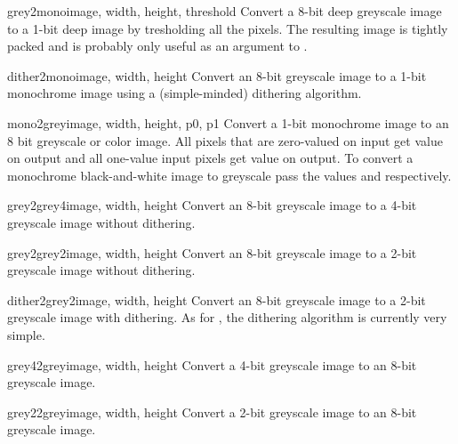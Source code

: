 \begin{funcdesc}{grey2mono}{image, width, height, threshold}
Convert a 8-bit deep greyscale image to a 1-bit deep image by
tresholding all the pixels.  The resulting image is tightly packed and
is probably only useful as an argument to .
\end{funcdesc}

\begin{funcdesc}{dither2mono}{image, width, height}
Convert an 8-bit greyscale image to a 1-bit monochrome image using a
(simple-minded) dithering algorithm.
\end{funcdesc}

\begin{funcdesc}{mono2grey}{image, width, height, p0, p1}
Convert a 1-bit monochrome image to an 8 bit greyscale or color image.
All pixels that are zero-valued on input get value  on output
and all one-value input pixels get value  on output.  To
convert a monochrome black-and-white image to greyscale pass the
values  and  respectively.
\end{funcdesc}

\begin{funcdesc}{grey2grey4}{image, width, height}
Convert an 8-bit greyscale image to a 4-bit greyscale image without
dithering.
\end{funcdesc}

\begin{funcdesc}{grey2grey2}{image, width, height}
Convert an 8-bit greyscale image to a 2-bit greyscale image without
dithering.
\end{funcdesc}

\begin{funcdesc}{dither2grey2}{image, width, height}
Convert an 8-bit greyscale image to a 2-bit greyscale image with
dithering.  As for , the dithering algorithm
is currently very simple.
\end{funcdesc}

\begin{funcdesc}{grey42grey}{image, width, height}
Convert a 4-bit greyscale image to an 8-bit greyscale image.
\end{funcdesc}

\begin{funcdesc}{grey22grey}{image, width, height}
Convert a 2-bit greyscale image to an 8-bit greyscale image.
\end{funcdesc}
